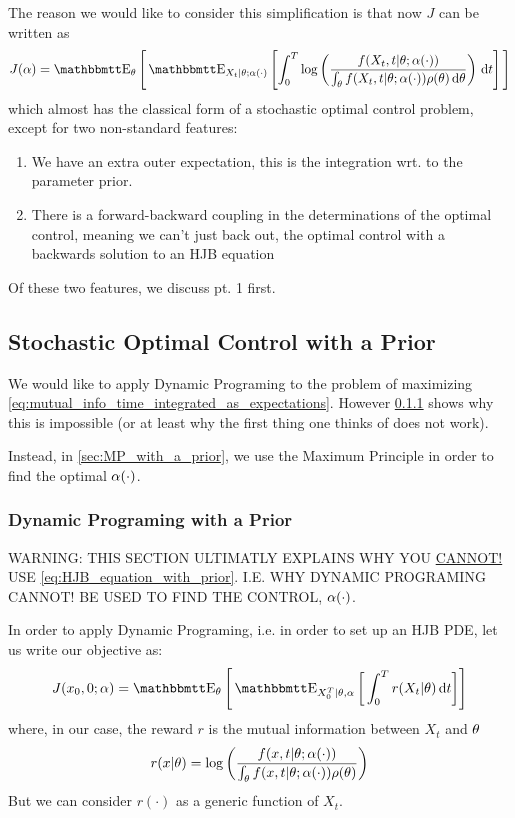 The reason we would like to consider this simplification is that now
$J$ can be written as
\begin{equation}
J( \a) = \Exp_{\th} \Bigg[
\Exp_{X_t|\th; \a(\cdot)}
\left[ \int_0^T \log\left(\frac{f(X_t,t|\th; \a(\cdot))}
{\int_\th f(X_t,t|\th; \a(\cdot)) \rho(\th)\intd{\th}}\right) \intd{t} \right]
\Bigg] 
\label{eq:mutual_info_time_integrated_as_expectations}
\end{equation}
which almost has the classical form of a stochastic optimal control
problem, except for two non-standard features:
\begin{enumerate}
  \item We have an extra outer expectation, this is the integration wrt. to the
  parameter prior.
\item There is a forward-backward coupling in the determinations of the optimal
control, meaning we can't just back out, the optimal control with a backwards
solution to an HJB equation
\end{enumerate}
Of these two features, we discuss pt. 1 first.

\subsection{Stochastic Optimal Control with a Prior}
We would like to apply Dynamic Programing to the problem of maximizing
\cref{eq:mutual_info_time_integrated_as_expectations}. However
\cref{sec:DP_with_a_prior} shows why this is impossible (or at least why the
first thing one thinks of does not work).

Instead, in \cref{sec:MP_with_a_prior}, we use the Maximum Principle in order to
find the optimal $\alpha(\cdot)$.

\subsubsection{Dynamic Programing with a Prior}
\label{sec:DP_with_a_prior}

WARNING: THIS SECTION ULTIMATLY EXPLAINS WHY YOU \underline{CANNOT!} USE
\cref{eq:HJB_equation_with_prior}. I.E. WHY DYNAMIC PROGRAMING CANNOT! BE
USED TO FIND THE CONTROL, $\alpha(\cdot)$. 

\vskip 15pt

In order to apply Dynamic Programing, i.e. in order to set up an HJB PDE, let us
write our objective as:
\begin{equation}
J(x_0, 0; \a) = \Exp_\th \Bigg[ \Exp_{X_0^T|\th, \a} \bigg[ \int_0^T r(X_t|
\th)\intd{t} \bigg]\Bigg]
\label{eq:stochastic_objective_with_prior_generic} 
\end{equation}
where, in our case, the reward $r$ is the mutual information between $X_t$ and
${ \theta}$ 
\begin{equation}
r(x|{ \theta}) = \log\left(\frac{f(x,t|{ \theta}; \alpha(\cdot))}
{\int_{ \theta} f(x,t|{ \theta}; \alpha(\cdot)) \rho({ \theta})}\right)
\label{eq:reward_funciont_mutual_information}
\end{equation}
But we can consider $r(\cdot)$ as a generic function of $X_t$.

